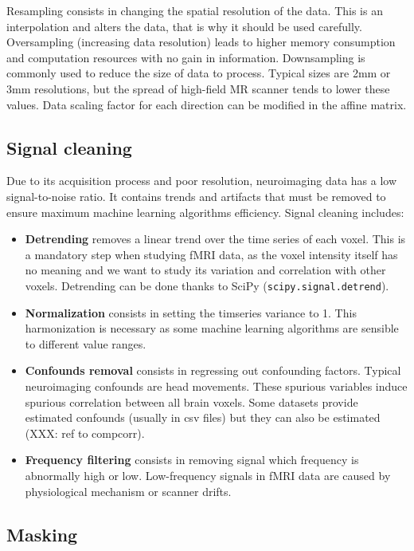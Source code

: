 \documentclass{frontiersSCNS} %
\begin{document}
Resampling consists in changing the spatial resolution of the data. This is
an interpolation and alters the data, that is why it should be used carefully.
Oversampling (increasing data resolution) leads to higher memory consumption
and computation resources with no gain in information.
Downsampling is commonly used to reduce the size of data to process.
Typical sizes are 2mm or 3mm resolutions, but the spread of high-field MR
scanner tends to lower these values.
Data scaling factor for each direction can be modified in the affine matrix.

\subsection{Signal cleaning}

Due to its acquisition process and poor resolution, neuroimaging data has a low
signal-to-noise ratio. It contains trends and artifacts that must be removed
to ensure maximum machine learning algorithms efficiency. Signal cleaning
includes:
\begin{itemize}
    \item{\bf Detrending} removes a linear trend over the time series of each
        voxel. This is a mandatory step when studying fMRI data, as the voxel
        intensity itself has no meaning and we want to study its variation and
        correlation with other voxels. Detrending can be done thanks to SciPy
        (\texttt{scipy.signal.detrend}).\\
    \item{\bf Normalization} consists in setting the timseries variance to 1.
        This harmonization is necessary as some machine learning algorithms are
        sensible to different value ranges.\\
    \item{\bf Confounds removal} consists in regressing out confounding factors.
        Typical neuroimaging confounds are head movements. These spurious
        variables induce spurious correlation between all brain voxels.
        Some datasets provide estimated confounds (usually in csv files) but
        they can also be estimated (XXX: ref to compcorr).
    \item{\bf Frequency filtering} consists in removing signal which frequency is
        abnormally high or low. Low-frequency signals in fMRI data are caused by
        physiological mechanism or scanner drifts.
\end{itemize}

\subsection{Masking}
\end{document}
